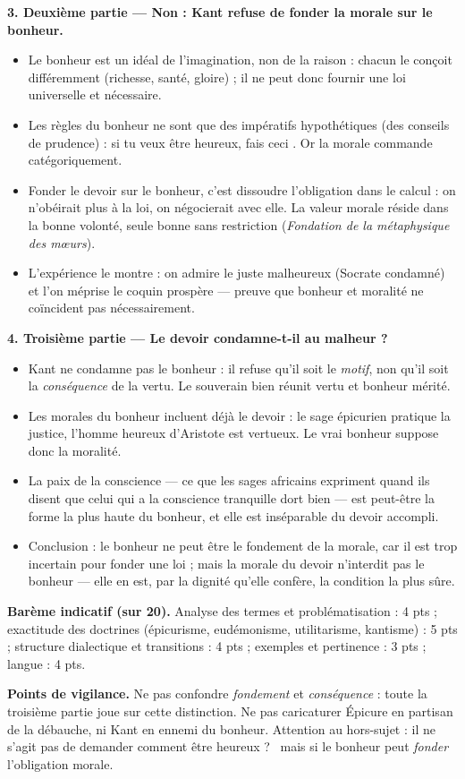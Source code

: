 \documentclass[11pt]{article}
\begin{document}
\begin{corrige}
\textbf{3. Deuxième partie — Non : Kant refuse de fonder la morale sur le bonheur.}
\begin{itemize}
\item Le bonheur est un idéal de l'imagination, non de la raison : chacun le conçoit différemment (richesse, santé, gloire) ; il ne peut donc fournir une loi universelle et nécessaire.
\item Les règles du bonheur ne sont que des impératifs hypothétiques (des conseils de prudence) : \guillemotleft si tu veux être heureux, fais ceci \guillemotright. Or la morale commande catégoriquement.
\item Fonder le devoir sur le bonheur, c'est dissoudre l'obligation dans le calcul : on n'obéirait plus à la loi, on négocierait avec elle. La valeur morale réside dans la bonne volonté, seule bonne sans restriction (\emph{Fondation de la métaphysique des mœurs}).
\item L'expérience le montre : on admire le juste malheureux (Socrate condamné) et l'on méprise le coquin prospère — preuve que bonheur et moralité ne coïncident pas nécessairement.
\end{itemize}

\textbf{4. Troisième partie — Le devoir condamne-t-il au malheur ?}
\begin{itemize}
\item Kant ne condamne pas le bonheur : il refuse qu'il soit le \emph{motif}, non qu'il soit la \emph{conséquence} de la vertu. Le souverain bien réunit vertu et bonheur mérité.
\item Les morales du bonheur incluent déjà le devoir : le sage épicurien pratique la justice, l'homme heureux d'Aristote est vertueux. Le vrai bonheur suppose donc la moralité.
\item La paix de la conscience — ce que les sages africains expriment quand ils disent que celui qui a la conscience tranquille dort bien — est peut-être la forme la plus haute du bonheur, et elle est inséparable du devoir accompli.
\item Conclusion : le bonheur ne peut être le fondement de la morale, car il est trop incertain pour fonder une loi ; mais la morale du devoir n'interdit pas le bonheur — elle en est, par la dignité qu'elle confère, la condition la plus sûre.
\end{itemize}

\textbf{Barème indicatif (sur 20).} Analyse des termes et problématisation : 4 pts ; exactitude des doctrines (épicurisme, eudémonisme, utilitarisme, kantisme) : 5 pts ; structure dialectique et transitions : 4 pts ; exemples et pertinence : 3 pts ; langue : 4 pts.

\textbf{Points de vigilance.} Ne pas confondre \emph{fondement} et \emph{conséquence} : toute la troisième partie joue sur cette distinction. Ne pas caricaturer Épicure en partisan de la débauche, ni Kant en ennemi du bonheur. Attention au hors-sujet : il ne s'agit pas de demander \guillemotleft comment être heureux ? \guillemotright\ mais si le bonheur peut \emph{fonder} l'obligation morale.
\end{corrige}
\end{document}
